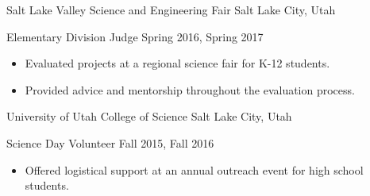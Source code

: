 \blockskip

\begin{tab1} Salt Lake Valley Science and Engineering Fair \> Salt Lake City, Utah \end{tab1}

\begin{tab2} Elementary Division Judge \> Spring 2016, Spring 2017 \end{tab2}
\begin{itemize}
    \item Evaluated projects at a regional science fair for K-12 students.
    \item Provided advice and mentorship throughout the evaluation process.
\end{itemize}

\blockskip

\begin{tab1} University of Utah College of Science \> Salt Lake City, Utah \end{tab1}

\begin{tab2} Science Day Volunteer \> Fall 2015, Fall 2016 \end{tab2}
\begin{itemize}
    \item Offered logistical support at an annual outreach event for high school students.
\end{itemize}

